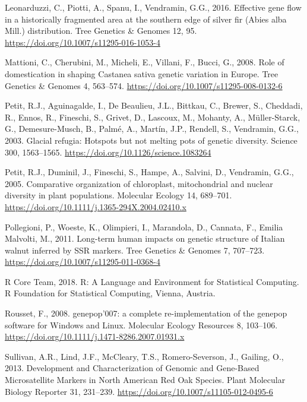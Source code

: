 \documentclass[12pt,a4paper,]{report}
\begin{document}
\leavevmode\hypertarget{ref-Leonarduzzi2016a}{}%
Leonarduzzi, C., Piotti, A., Spanu, I., Vendramin, G.G., 2016. Effective
gene flow in a historically fragmented area at the southern edge of
silver fir (Abies alba Mill.) distribution. Tree Genetics \& Genomes 12,
95. \url{https://doi.org/10.1007/s11295-016-1053-4}

\leavevmode\hypertarget{ref-Mattioni2008}{}%
Mattioni, C., Cherubini, M., Micheli, E., Villani, F., Bucci, G., 2008.
Role of domestication in shaping Castanea sativa genetic variation in
Europe. Tree Genetics \& Genomes 4, 563--574.
\url{https://doi.org/10.1007/s11295-008-0132-6}

\leavevmode\hypertarget{ref-Petit2003}{}%
Petit, R.J., Aguinagalde, I., De Beaulieu, J.L., Bittkau, C., Brewer,
S., Cheddadi, R., Ennos, R., Fineschi, S., Grivet, D., Lascoux, M.,
Mohanty, A., Müller-Starck, G., Demesure-Musch, B., Palmé, A., Martín,
J.P., Rendell, S., Vendramin, G.G., 2003. Glacial refugia: Hotspots but
not melting pots of genetic diversity. Science 300, 1563--1565.
\url{https://doi.org/10.1126/science.1083264}

\leavevmode\hypertarget{ref-Petit2005}{}%
Petit, R.J., Duminil, J., Fineschi, S., Hampe, A., Salvini, D.,
Vendramin, G.G., 2005. Comparative organization of chloroplast,
mitochondrial and nuclear diversity in plant populations. Molecular
Ecology 14, 689--701.
\url{https://doi.org/10.1111/j.1365-294X.2004.02410.x}

\leavevmode\hypertarget{ref-Pollegioni2011}{}%
Pollegioni, P., Woeste, K., Olimpieri, I., Marandola, D., Cannata, F.,
Emilia Malvolti, M., 2011. Long-term human impacts on genetic structure
of Italian walnut inferred by SSR markers. Tree Genetics \& Genomes 7,
707--723. \url{https://doi.org/10.1007/s11295-011-0368-4}

\leavevmode\hypertarget{ref-RCoreTeam2018}{}%
R Core Team, 2018. R: A Language and Environment for Statistical
Computing. R Foundation for Statistical Computing, Vienna, Austria.

\leavevmode\hypertarget{ref-Rousset2008}{}%
Rousset, F., 2008. genepop'007: a complete re-implementation of the
genepop software for Windows and Linux. Molecular Ecology Resources 8,
103--106. \url{https://doi.org/10.1111/j.1471-8286.2007.01931.x}

\leavevmode\hypertarget{ref-Sullivan2013}{}%
Sullivan, A.R., Lind, J.F., McCleary, T.S., Romero-Severson, J.,
Gailing, O., 2013. Development and Characterization of Genomic and
Gene-Based Microsatellite Markers in North American Red Oak Species.
Plant Molecular Biology Reporter 31, 231--239.
\url{https://doi.org/10.1007/s11105-012-0495-6}
\end{document}
